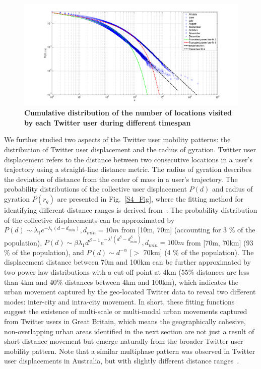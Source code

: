 \documentclass[]{tGIS2e}
\begin{document}
\begin{figure}[ht]
\includegraphics[width=1.0\linewidth]{./figure/S3_visitation}
\caption{ \bfseries{Cumulative distribution of the number of locations visited by each Twitter user during different timespan}}
\label{S3_Fig}
\end{figure}

We further studied two aspects of the Twitter user mobility patterns: the distribution of Twitter user displacement and the radius of gyration. 
Twitter user displacement refers to the distance between two consecutive locations in a user's trajectory using a straight-line distance metric.
The radius of gyration describes the deviation of distance from the center of mass in a user's trajectory.
The probability distributions of the collective user displacement $P(d)$ and radius of gyration $P(r_g)$ are presented in Fig.~\ref{S4_Fig}, where the fitting method for identifying different distance ranges is derived from~\citep{jurdak2015}.
The probability distribution of the collective displacements can be approximated by $P(d) \sim \lambda_{1} e^{-\lambda_{1}(d - d_{min})}, d_{min}=10m$ from [10m, 70m] (accounting for 3 $\%$ of the population),  $ P(d) \sim \beta\lambda_{1}d^{\beta-1}e^{-\lambda^{1}(d^\beta-d_{min}^\beta)}, d_{min} = 100m$ from [70m, 70km] (93 $\%$ of the population), and $P(d) \sim {d}^{-\alpha}$ [$>$ 70km] (4 $\%$ of the population). 
The displacement distance between 70m and 100km can be further approximated by two power law distributions with a cut-off point at 4km (55$\%$ distances are less than 4km and 40$\%$ distances between 4km and 100km), which indicates the urban movement captured by the geo-located Twitter data to reveal two different modes: inter-city and intra-city movement. 
In short, these fitting functions suggest the existence of multi-scale or multi-modal urban movements captured from Twitter users in Great Britain, which means the geographically cohesive, non-overlapping urban areas identified in the next section are not just a result of short distance movement but emerge naturally from the broader Twitter user mobility pattern.
Note that a similar multiphase pattern was observed in Twitter user displacements in Australia, but with slightly different distance ranges~\citep{jurdak2015}.
\end{document}
